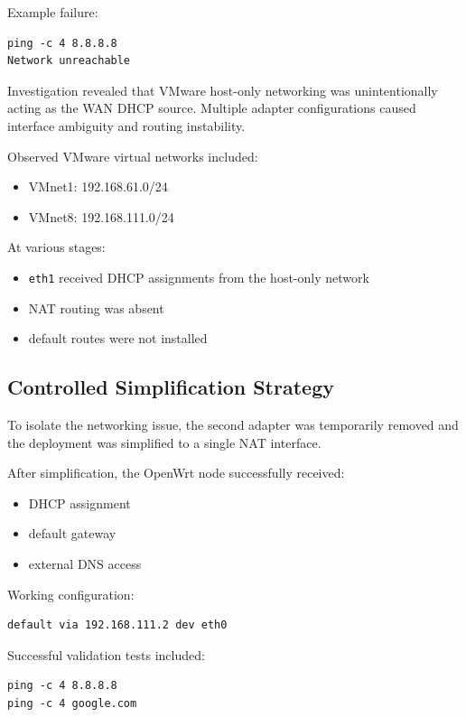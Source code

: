 \documentclass[conference]{IEEEtran}
\begin{document}
Example failure:

\begin{verbatim}
ping -c 4 8.8.8.8
Network unreachable
\end{verbatim}

Investigation revealed that VMware host-only networking was unintentionally acting as the WAN DHCP source. Multiple adapter configurations caused interface ambiguity and routing instability.

Observed VMware virtual networks included:

\begin{itemize}
    \item VMnet1: 192.168.61.0/24
    \item VMnet8: 192.168.111.0/24
\end{itemize}

At various stages:
\begin{itemize}
    \item \texttt{eth1} received DHCP assignments from the host-only network
    \item NAT routing was absent
    \item default routes were not installed
\end{itemize}

\subsection{Controlled Simplification Strategy}

To isolate the networking issue, the second adapter was temporarily removed and the deployment was simplified to a single NAT interface.

After simplification, the OpenWrt node successfully received:

\begin{itemize}
    \item DHCP assignment
    \item default gateway
    \item external DNS access
\end{itemize}

Working configuration:

\begin{verbatim}
default via 192.168.111.2 dev eth0
\end{verbatim}

Successful validation tests included:

\begin{verbatim}
ping -c 4 8.8.8.8
ping -c 4 google.com
\end{verbatim}
\end{document}
